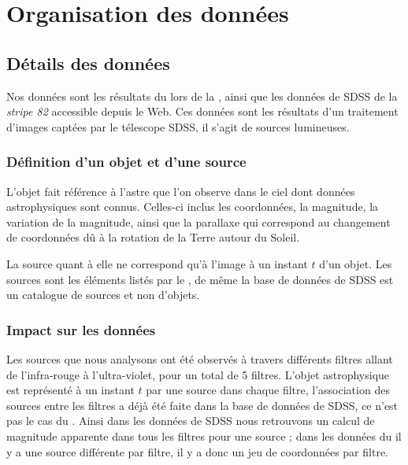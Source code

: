 

\section{Organisation des données}

	\subsection{Détails des données}

Nos données sont les résultats du \stack{} lors de la \DC{}, ainsi que les données de SDSS de la \emph{stripe 82} accessible depuis le Web. Ces données sont les résultats d'un traitement d'images captées par le télescope SDSS, il s'agit de sources lumineuses.

		\subsubsection{Définition d'un objet et d'une source}

L'objet fait référence à l'astre que l'on observe dans le ciel dont données astrophysiques sont connus. Celles-ci inclus les coordonnées, la magnitude, la variation de la magnitude, ainsi que la parallaxe qui correspond au changement de coordonnées dû à la rotation de la Terre autour du Soleil.

La source quant à elle ne correspond qu'à l'image à un instant $t$ d'un objet. Les sources sont les éléments listés par le \stack{}, de même la base de données de SDSS est un catalogue de sources et non d'objets.

		\subsubsection{Impact sur les données}

Les sources que nous analysons ont été observés à travers différents filtres allant de l'infra-rouge à l'ultra-violet, pour un total de 5 filtres. L'objet astrophysique est représenté à un instant $t$ par une source dans chaque filtre, l'association des sources entre les filtres a déjà été faite dans la base de données de SDSS, ce n'est pas le cas du \stack{}. Ainsi dans les données de SDSS nous retrouvons un calcul de magnitude apparente dans tous les filtres pour une source ; dans les données du \stack{} il y a une source différente par filtre, il y a donc un jeu de coordonnées par filtre.


